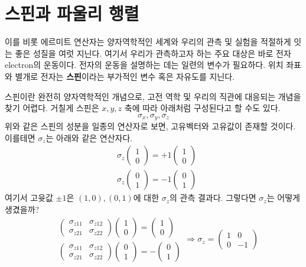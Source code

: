 \documentclass[a4paper,atbegshi,chapter,]{oblivoir}
\begin{document}
\section{스핀과 파울리 행렬}
이를 비롯 에르미트 연산자는 양자역학적인 세계와 우리의 관측 및 실험을 적절하게 잇는 좋은
성질을 여럿 지닌다. 여기서 우리가 관측하고자 하는 주요 대상은 바로 전자{\tiny electron}의
운동이다. 전자의 운동을 설명하는 데는 일련의 변수가 필요하다. 위치 좌표와 별개로
전자는 \textbf{스핀}이라는 부가적인 변수 혹은 자유도를 지닌다. 

스핀이란 완전히 양자역학적인 개념으로, 고전 역학 및 우리의 직관에 대응되는 개념을 찾기
어렵다. 거칠게 스핀은 $x,y,z$ 축에 따라 아래처럼 구성된다고 할 수도 있다.
\[
  \sigma_x, \sigma_y, \sigma_z
\]
위와 같은 스핀의 성분을 일종의 연산자로 보면, 고유벡터와 고유값이 존재할 것이다.
이를테면 $\sigma_z$는 아래와 같은 연산자다. 
\begin{align*}
  &\sigma_z\begin{pmatrix}1\\0\end{pmatrix} = +1\begin{pmatrix}1\\0\end{pmatrix} \\
  &\sigma_z\begin{pmatrix}0\\1\end{pmatrix} = -1\begin{pmatrix}0\\1\end{pmatrix}
\end{align*}
여기서 고윳값 $\pm1$은 $(1,0),(0,1)$에 대한 $\sigma_z$의 관측 결과다. 그렇다면 $\sigma_z$는
어떻게 생겼을까?
\[
\begin{aligned}
  &\begin{pmatrix}\sigma_{z11}&\sigma_{z12}\\\sigma_{z21}&\sigma_{z22}\end{pmatrix}
  \begin{pmatrix}1\\0\end{pmatrix}=\begin{pmatrix}1\\0\end{pmatrix} \\
  &\begin{pmatrix}\sigma_{z11}&\sigma_{z12}\\\sigma_{z21}&\sigma_{z22}\end{pmatrix}
  \begin{pmatrix}0\\1\end{pmatrix}=-\begin{pmatrix}0\\1\end{pmatrix}
\end{aligned}
\Longrightarrow
\sigma_z = \begin{pmatrix}1&0\\0&-1\end{pmatrix}
\]
\end{document}
